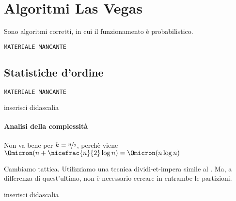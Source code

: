 \section{Algoritmi Las Vegas}

\begin{idea}
Sono algoritmi corretti, in cui il funzionamento è probabilistico.
\end{idea}

\texttt{MATERIALE MANCANTE}

\subsection{Statistiche d'ordine}

\texttt{MATERIALE MANCANTE}

\begin{algorithm}[H]
\caption{inserisci didascalia}


\end{algorithm}



\paragraph{Analisi della complessità}
Non va bene per \(k = \nicefrac{n}{2}\), perchè viene \(\Omicron(n + \nicefrac{n}{2} \log n) = \Omicron(n \log n)\)

Cambiamo tattica.
Utilizziamo una tecnica dividi-et-impera simile al \quickSort.
Ma, a differenza di quest'ultimo, non è necessario cercare in entrambe le partizioni.

\begin{algorithm}[H]
\caption{inserisci didascalia}


\end{algorithm}


